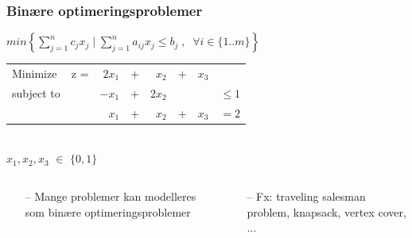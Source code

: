 \documentclass[smaller,handouts]{beamer}
\begin{document}
\begin{frame}
\frametitle{Binære optimeringsproblemer}
\begin{center}
        $min \left\{\sum\limits_{j=1}^n c_jx_j \; \Big| \; \sum\limits_{j=1}^n a_{ij}x_j \leq b_j \; , \; \; 
\forall i \in 
\{1..m\}\right\}$
\pause
\medskip \\
\begin{tabular}{llrcrlrl}
Minimize   & z =&$2x_1$        & +  & $x_2$       & + & $x_3$ &          \\
subject to &     &$-x_1$        & + & $2x_2$      &   &       & $\leq 1$  \\
           &     &$x_1$         & + & $x_2$       & + & $x_3$ & $=2$     \\
               
\end{tabular} \\ 
 $x_1,x_2,x_3 $  $\in$ $\{0,1\}$ 
 \pause
\end{center}
\begin{columns}[T]
    \begin{column}[T]{.5\textwidth}
    \begin{itemize}[<+->]
     \item [--]Mange problemer kan modelleres som binære optimeringsproblemer 
    \end{itemize}
    \end{column}
    
       \begin{column}[T]{.5\textwidth}
           \begin{itemize}[<+->]
     \item [--]Fx: traveling salesman problem, knapsack, vertex cover, ... \newline\newline
    \end{itemize}
       \end{column}
       

\end{columns}
\end{frame}
\end{document}
